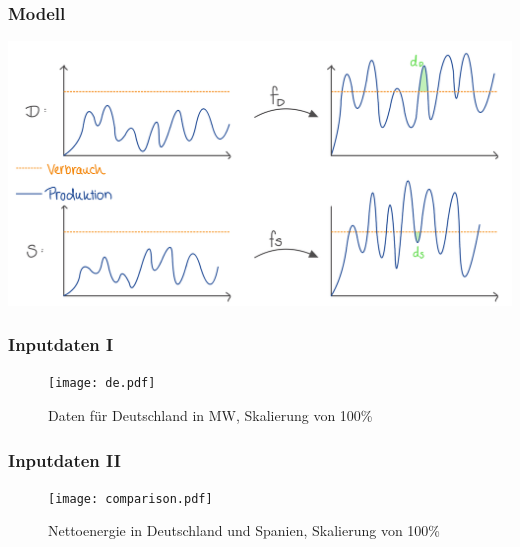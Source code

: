 \documentclass[aspectratio=169,t]{beamer}
\begin{document}
	\begin{frame}
		\frametitle{Modell}
		\vspace{-2mm}
		
		
		\begin{minipage}{.9\linewidth}
			\centering
			\includegraphics[width=.9\linewidth]{IMG_320.jpg}
			
		\end{minipage}
		
	\end{frame}


	
	
	\begin{frame}
		\frametitle{Inputdaten I}
		\vspace{-2mm}
		\begin{figure}
			\texttt{[image: de.pdf]}
			\caption{Daten für Deutschland in MW, Skalierung von 100\%}
		\end{figure}
		
	\end{frame}
	
	\begin{frame}
		\frametitle{Inputdaten II}
		\vspace{-2mm}
		\begin{figure}
			\texttt{[image: comparison.pdf]}
			\caption{Nettoenergie in Deutschland und Spanien, Skalierung von 100\%}
		\end{figure}
	\end{frame}
	
\end{document}
